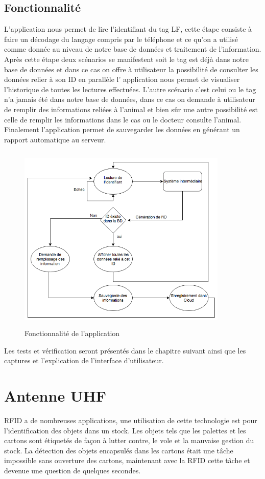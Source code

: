\documentclass[11pt, a4paper, twoside]{book}
\begin{document}
\subsection{Fonctionnalité}
L'application nous permet de lire l'identifiant du tag LF, cette étape consiste à faire un décodage du langage compris par le téléphone et ce qu'on a utilisé comme donnée au niveau de notre base de données et traitement de l'information. Après cette étape deux scénarios se manifestent soit le tag est déjà dans notre base de données et dans ce cas on offre à utilisateur la possibilité de consulter les données relier à son ID en parallèle l' application nous permet de visualiser l'historique de toutes les lectures effectuées. L'autre scénario c'est celui ou le tag n'a jamais été dans notre base de données, dans ce cas on demande à utilisateur de remplir des informations reliées à l'animal et bien sûr une autre possibilité est celle de remplir les informations dans le cas ou le docteur consulte l'animal. Finalement l'application permet de sauvegarder les données en générant un rapport automatique au serveur.

\begin{figure}[H]
\centering
\includegraphics[width=10cm,height=9cm]{fonc}
\caption{Fonctionnalité de l'application}
\end{figure}
Les tests et vérification seront présentés dans le chapitre suivant ainsi que les captures et l'explication de l'interface d'utilisateur.

\section{Antenne UHF}
RFID a de nombreuses applications, une utilisation de cette technologie est pour l'identification des objets dans un stock. Les objets tels que les palettes et les cartons sont étiquetés de façon à lutter contre, le vole et la mauvaise gestion du stock. La détection des objets encapsulés dans les cartons était une tâche impossible sans ouverture des cartons, maintenant avec la RFID cette tâche et devenue une question de quelques secondes.
\end{document}
